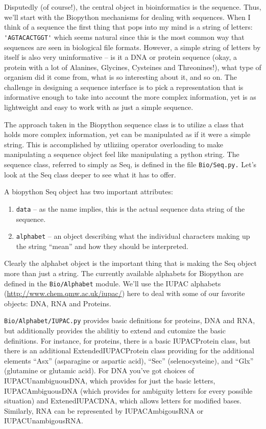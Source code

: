 \documentclass{report}
\begin{document}
Disputedly (of course!), the central object in bioinformatics is the sequence. Thus, we'll start with the Biopython mechanisms for dealing with sequences. When I think of a sequence the first thing that pops into my mind is a string of letters:\verb| 'AGTACACTGGT'| which seems natural since this is the most common way that sequences are seen in biological file formats.  However, a simple string of letters by itself is also very uninformative -- is it a DNA or  protein sequence (okay, a protein with a lot of Alanines, Glycines, Cysteines and Threonines!), what type of organism did it come from, what is so interesting about it, and so on. The challenge in designing a sequence interface is to pick a representation that is informative enough to take into account the more complex information, yet is as lightweight and easy to work with as just a simple sequence.


The approach taken in the Biopython sequence class is to utilize a class that holds more complex information, yet can be manipulated as if it were a simple string. This is accomplished by utliziing operator overloading to make manipulating a sequence object feel like manipulating a python string. The sequence class, referred to simply as Seq,  is defined in the file \verb|Bio/Seq.py.| Let's look at the Seq class deeper to see what it has to offer.


A biopython Seq object has two important attributes:

\begin{enumerate}

\item \verb|data| -- as the name implies, this is the actual sequence data string of the sequence.

\item \verb|alphabet| -- an object describing what the individual characters making up the string ``mean'' and how they should be interpreted.

\end{enumerate}

Clearly the alphabet object is the important thing that is making the Seq object more than just a string. The currently available alphabets for Biopython are defined in the \verb|Bio/Alphabet| module. We'll use the IUPAC alphabets \ahrefurl ({\url{http://www.chem.qmw.ac.uk/iupac/}}) here to deal with some of our favorite objects: DNA, RNA and Proteins.  


\verb|Bio/Alphabet/IUPAC.py| provides basic definitions for proteins, DNA and RNA, but additionally provides the abilitiy to extend and cutomize the basic definitions. For instance, for proteins, there is a basic IUPACProtein class, but there is an additional ExtendedIUPACProtein class providing for the additional elements ``Asx'' (asparagine or aspartic acid), ``Sec'' (selenocysteine), and ``Glx'' (glutamine or glutamic acid). For DNA you've got choices of IUPACUnambiguousDNA, which provides for just the basic letters, IUPACAmbiguousDNA (which provides for ambiguity letters for every possible situation) and ExtenedIUPACDNA, which allows letters for modified bases. Similarly, RNA can be represented by IUPACAmbigousRNA or IUPACUnambigousRNA.
\end{document}
